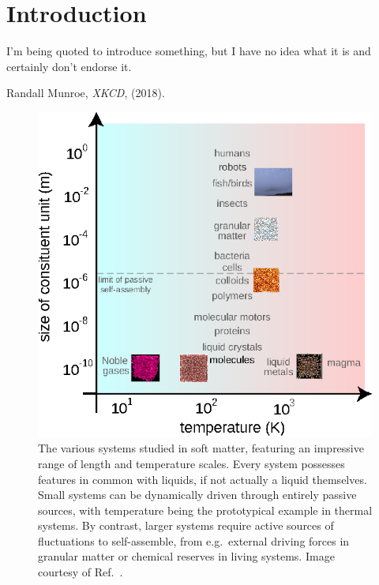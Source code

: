 \documentclass[11pt,twoside]{report}
\begin{document}
\chapter{Introduction}
\epigraph{I'm being quoted to introduce something, but I have no idea what it is and certainly don't endorse it.}{Randall Munroe, \emph{XKCD}, (2018).}

\begin{figure}
  \includegraphics[width=0.75\linewidth,outer]{soft-matter}
  \caption[A loose hierarchy of systems in soft matter]{
    The various systems studied in soft matter, featuring an impressive range of length and temperature scales.
    Every system possesses features in common with liquids, if not actually a liquid themselves.
    Small systems can be dynamically driven through entirely passive sources, with temperature being the prototypical example in thermal systems.
    By contrast, larger systems require active sources of fluctuations to self-assemble, from e.g.\ external driving forces in granular matter or chemical reserves in living systems.
    Image courtesy of Ref.\ \cite{RoyallSoftMatter}.}
  \label{fig:soft-matter}
\end{figure}
\end{document}
